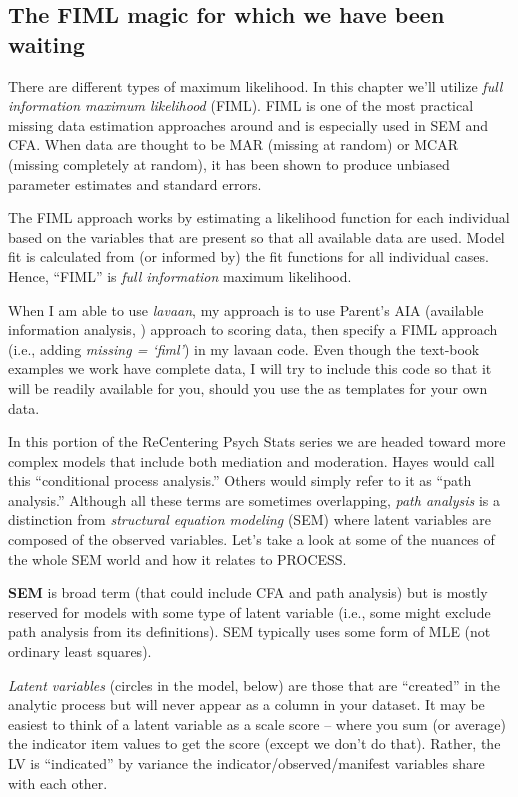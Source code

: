 \documentclass[
  english,
]{book}
\begin{document}
\hypertarget{the-fiml-magic-for-which-we-have-been-waiting}{%
\subsection{The FIML magic for which we have been waiting}\label{the-fiml-magic-for-which-we-have-been-waiting}}

There are different types of maximum likelihood. In this chapter we'll utilize \emph{full information maximum likelihood} (FIML). FIML is one of the most practical missing data estimation approaches around and is especially used in SEM and CFA. When data are thought to be MAR (missing at random) or MCAR (missing completely at random), it has been shown to produce unbiased parameter estimates and standard errors.

The FIML approach works by estimating a likelihood function for each individual based on the variables that are present so that all available data are used. Model fit is calculated from (or informed by) the fit functions for all individual cases. Hence, ``FIML'' is \emph{full information} maximum likelihood.

When I am able to use \emph{lavaan}, my approach is to use Parent's AIA (available information analysis, \citeyearpar{parent_handling_2013}) approach to scoring data, then specify a FIML approach (i.e., adding \emph{missing = `fiml'}) in my lavaan code. Even though the text-book examples we work have complete data, I will try to include this code so that it will be readily available for you, should you use the as templates for your own data.

In this portion of the ReCentering Psych Stats series we are headed toward more complex models that include both mediation and moderation. Hayes \citep{hayes_introduction_2018} would call this ``conditional process analysis.'' Others would simply refer to it as ``path analysis.'' Although all these terms are sometimes overlapping, \emph{path analysis} is a distinction from \emph{structural equation modeling} (SEM) where latent variables are composed of the observed variables. Let's take a look at some of the nuances of the whole SEM world and how it relates to PROCESS.

\textbf{SEM} is broad term (that could include CFA and path analysis) but is mostly reserved for models with some type of latent variable (i.e., some might exclude path analysis from its definitions). SEM typically uses some form of MLE (not ordinary least squares).

\emph{Latent variables} (circles in the model, below) are those that are ``created'' in the analytic process but will never appear as a column in your dataset. It may be easiest to think of a latent variable as a scale score -- where you sum (or average) the indicator item values to get the score (except we don't do that). Rather, the LV is ``indicated'' by variance the indicator/observed/manifest variables share with each other.
\end{document}
